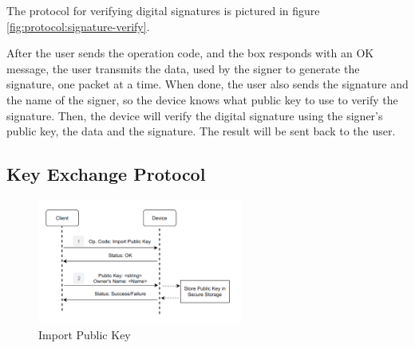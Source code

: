 The protocol for verifying digital signatures is pictured in figure \ref{fig:protocol:signature-verify}.

After the user sends the operation code, and the box responds with an OK message, the user transmits the data, used by the signer to generate the signature, one packet at a time.
When done, the user also sends the signature and the name of the signer, so the device knows what public key to use to verify the signature.
Then, the device will verify the digital signature using the signer's public key, the data and the signature. The result will be sent back to the user.

\subsection{Key Exchange Protocol} \label{chap:sol:protocol:key}

\begin{figure}[h]
	\centering
	\includegraphics[width=0.6\textwidth]{./Images/import-pub-key.png}
	\caption{Import Public Key}
	\label{fig:protocol:import-pub}
\end{figure}

